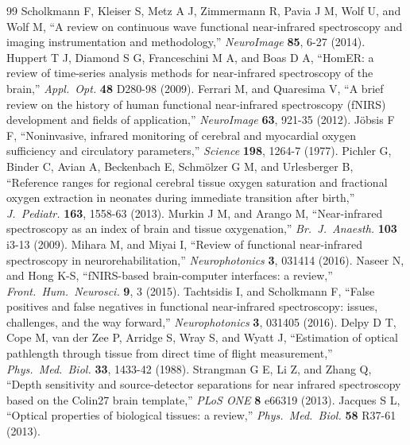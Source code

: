 \documentclass[11pt]{article}
\begin{document}
\begin{thebibliography}{99}
 Scholkmann F, Kleiser S, Metz A J, Zimmermann R, Pavia J M, Wolf U, and Wolf M, ``A review on continuous wave functional near-infrared spectroscopy and imaging instrumentation and methodology,'' \textit{NeuroImage} \textbf{85}, 6-27 (2014).
 Huppert T J, Diamond S G, Franceschini M A, and Boas D A, ``HomER: a review of time-series analysis methods for near-infrared spectroscopy of the brain,'' \textit{Appl.\ Opt.} \textbf{48} D280-98 (2009).
 Ferrari M, and Quaresima V, ``A brief review on the history of human functional near-infrared spectroscopy (fNIRS) development and fields of application,'' \textit{NeuroImage} \textbf{63}, 921-35 (2012).
 J\"obsis F F, ``Noninvasive, infrared monitoring of cerebral and myocardial oxygen sufficiency and circulatory parameters,'' \textit{Science} \textbf{198}, 1264-7 (1977).
 Pichler G, Binder C, Avian A, Beckenbach E, Schm\"olzer G M, and Urlesberger B, ``Reference ranges for regional cerebral tissue oxygen saturation and fractional oxygen extraction in neonates during immediate transition after birth,'' \textit{J.\ Pediatr.} \textbf{163}, 1558-63 (2013).
 Murkin J M, and Arango M, ``Near-infrared spectroscopy as an index of brain and tissue oxygenation,'' \textit{Br.\ J.\ Anaesth.} \textbf{103} i3-13 (2009).
 Mihara M, and Miyai I, ``Review of functional near-infrared spectroscopy in neurorehabilitation,'' \textit{Neurophotonics} \textbf{3}, 031414 (2016).
 Naseer N, and Hong K-S, ``fNIRS-based brain-computer interfaces: a review,'' \textit{Front.\ Hum.\ Neurosci.} \textbf{9}, 3 (2015).
 Tachtsidis I, and Scholkmann F, ``False positives and false negatives in functional near-infrared spectroscopy: issues, challenges, and the way forward,'' \textit{Neurophotonics} \textbf{3}, 031405 (2016).
 Delpy D T, Cope M, van der Zee P, Arridge S, Wray S, and Wyatt J, ``Estimation of optical pathlength through tissue from direct time of flight measurement,'' \textit{Phys.\ Med.\ Biol.} \textbf{33}, 1433-42 (1988).
 Strangman G E, Li Z, and Zhang Q, ``Depth sensitivity and source-detector separations for near infrared spectroscopy based on the Colin27 brain template,'' \textit{PLoS ONE} \textbf{8} e66319 (2013).
 Jacques S L, ``Optical properties of biological tissues: a review,'' \textit{Phys.\ Med.\ Biol.} \textbf{58} R37-61 (2013).

\end{thebibliography}
\end{document}
